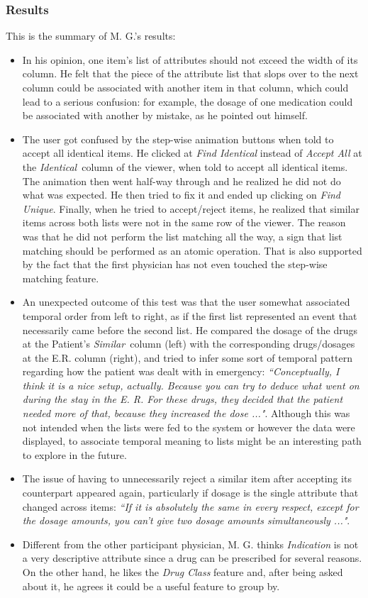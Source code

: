 \documentclass{chi2009}
\newcommand{\Similar}{\textit{Similar}}
\newcommand{\Identical}{\textit{Identical}}
\begin{document}
\subsubsection{Results}
This is the summary of M. G.'s results:
\begin{itemize}
\item In his opinion, one item's list of attributes should not exceed the width of its column. He felt that the piece of the attribute list that slops over to the next column could be associated with another item in that column, which could lead to a serious confusion: for example, the dosage of one medication could be associated with another by mistake, as he pointed out himself. 
\item The user got confused by the step-wise animation buttons when told to accept all identical items. He clicked at \textit{Find Identical} instead of \textit{Accept All} at the \Identical~column of the viewer, when told to accept all identical items. The animation then went half-way through and he realized he did not do what was expected. He then tried to fix it and ended up clicking on \textit{Find Unique}. Finally, when he tried to accept/reject items, he realized that similar items across both lists were not in the same row of the viewer. The reason was that he did not perform the list matching all the way, a sign that list matching should be performed as an atomic operation. That is also supported by the fact that the first physician has not even touched the step-wise matching feature.
\item An unexpected outcome of this test was that the user somewhat associated temporal order from left to right, as if the first list represented an event that necessarily came before the second list. He compared the dosage of the drugs at the Patient's \Similar~column (left) with the corresponding drugs/dosages at the E.R. column (right), and tried to infer some sort of temporal pattern regarding how the patient was dealt with in emergency: \textit{``Conceptually, I think it is a nice setup, actually. Because you can try to deduce what went on during the stay in the E. R. For these drugs, they decided that the patient needed more of that, because they increased the dose ..."}. Although this was not intended when the lists were fed to the system or however the data were displayed, to associate temporal meaning to lists might be an interesting path to explore in the future.
\item The issue of having to unnecessarily reject a similar item after accepting its counterpart appeared again, particularly if dosage is the single attribute that changed across items: \textit{``If it is absolutely the same in every respect, except for the dosage amounts, you can't give two dosage amounts simultaneously ..."}.
\item Different from the other participant physician, M. G.  thinks \textit{Indication} is not a very descriptive attribute since a drug can be prescribed for several reasons. On the other hand, he likes the \textit{Drug Class} feature and, after being asked about it, he agrees it could be a useful feature to group by.
\end{itemize}
\end{document}

